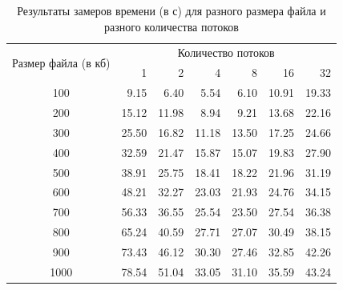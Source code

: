\begin{table}[h]
	\begin{center}
		\begin{threeparttable}
			\captionsetup{justification=raggedright,singlelinecheck=off}
			\caption{Результаты замеров времени (в с) для разного размера файла и разного количества потоков}
			\label{tbl:time_mes_par}
			\begin{tabular}{|c|r|r|r|r|r|r|}
				\hline            
				\multirow{2}{*}{Размер файла (в кб)}& \multicolumn{6}{c|}{Количество потоков} \\
				\cline{2-7}
				& 1 & 2 & 4 & 8 & 16 & 32 \\
				\hline
				100 & 9.15 & 6.40 & 5.54 & 6.10 & 10.91 & 19.33 \\ 
				\hline
				200 & 15.12 & 11.98 & 8.94 & 9.21 & 13.68 & 22.16 \\ 
				\hline
				300 & 25.50 & 16.82 & 11.18 & 13.50 & 17.25 & 24.66 \\ 
				\hline
				400 & 32.59 & 21.47 & 15.87 & 15.07 & 19.83 & 27.90 \\ 
				\hline
				500 & 38.91 & 25.75 & 18.41 & 18.22 & 21.96 & 31.19 \\ 
				\hline
				600 & 48.21 & 32.27 & 23.03 & 21.93 & 24.76 & 34.15 \\ 
				\hline
				700 & 56.33 & 36.55 & 25.54 & 23.50 & 27.54 & 36.38 \\ 
				\hline
				800 & 65.24 & 40.59 & 27.71 & 27.07 & 30.49 & 38.15 \\ 
				\hline
				900 & 73.43 & 46.12 & 30.30 & 27.46 & 32.85 & 42.26 \\ 
				\hline
				1000 & 78.54 & 51.04 & 33.05 & 31.10 & 35.59 & 43.24 \\ 
				\hline
			\end{tabular}
		\end{threeparttable}
	\end{center}
\end{table}

\clearpage

